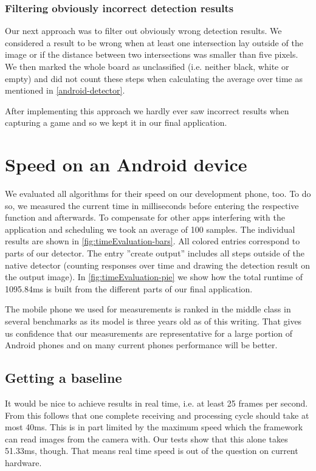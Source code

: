	\subsubsection{Filtering obviously incorrect detection results}
	\label{evaluation-prepostprocessing-filteringOutliers-filteringWrong}
	Our next approach was to filter out obviously wrong detection results. We considered a result to be wrong when at least one intersection lay outside of the image or if the distance between two intersections was smaller than five pixels. We then marked the whole board as unclassified (i.e. neither black, white or empty) and did not count these steps when calculating the average over time as mentioned in \autoref{android-detector}.

	After implementing this approach we hardly ever saw incorrect results when capturing a game and so we kept it in our final application.






	\section{Speed on an Android device}
	\label{evaluation-speed}
	We evaluated all algorithms for their speed on our development phone, too. To do so, we measured the current time in milliseconds before entering the respective function and afterwards. To compensate for other apps interfering with the application and scheduling we took an average of 100 samples. The individual results are shown in \autoref{fig:timeEvaluation-bars}. All colored entries correspond to parts of our detector. The entry ''create output'' includes all steps outside of the native detector (counting responses over time and drawing the detection result on the output image). In \autoref{fig:timeEvaluation-pie} we show how the total runtime of 1095.84ms is built from the different parts of our final application.

	The mobile phone we used for measurements is ranked in the middle class in several benchmarks\cite{antutuBench,primateBench} as its model is three years old as of this writing. That gives us confidence that our measurements are representative for a large portion of Android phones and on many current phones performance will be better.

	\subsection{Getting a baseline}
	\label{evaluation-speed-baseline}
	It would be nice to achieve results in real time, i.e. at least 25 frames per second. From this follows that one complete receiving and processing cycle should take at most 40ms. This is in part limited by the maximum speed which the framework can read images from the camera with. Our tests show that this alone takes 51.33ms, though. That means real time speed is out of the question on current hardware.

